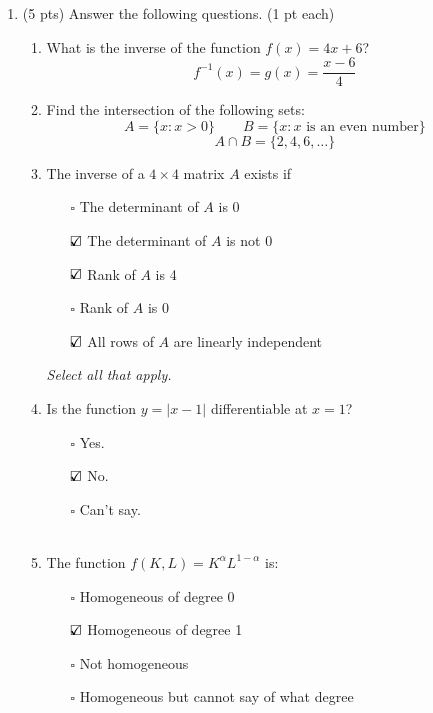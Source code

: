 \documentclass{./../../Latex/tests}
\begin{document}
\thispagestyle{plain}

\vspace{0.5em}

\begin{enumerate}
\item (5 pts) Answer the following questions. (1 pt each)
\begin{enumerate}
\item What is the inverse of the function $f(x)= 4x + 6$? \\
$$ f^{-1}(x) = g(x) = \frac{x-6}{4}  $$

\vspace{1em}
\item  Find the intersection of the following sets:
$$ A = \{x: x>0 \} \quad \quad B = \{x: x\text{ is an even number} \} $$ 
$$ A \cap B = \{2, 4, 6, \hdots \}  $$ 

\vspace{1em}
\item  The inverse of a $4\times 4$ matrix $A$ exists if
\begin{itemize}
	\item[$\square$] The determinant of $A$ is 0 
	\item[$\text{\rlap{$\checkmark$}}\square$] The determinant of $A$ is not 0 
	\item[$\text{\rlap{$\checkmark$}}\square$] Rank of $A$ is 4
	\item[$\square$] Rank of $A$ is 0
	\item[$\text{\rlap{$\checkmark$}}\square$] All rows of $A$ are linearly independent
\end{itemize}  
\textit{Select all that apply.}

\vspace{1em}
\item  Is the function $y=|x-1|$ differentiable at $x=1$? 
\begin{itemize}
	\item[$\square$] Yes. 
	\item[$\text{\rlap{$\checkmark$}}\square$] No.
	\item[$\square$] Can't say. \\~\\
\end{itemize}  
\item The function $f(K,L) = K^{\alpha} L^{1-\alpha}$ is:
\begin{itemize}
  \item[$\square$] Homogeneous of degree 0
  \item[$\text{\rlap{$\checkmark$}}\square$] Homogeneous of degree 1
  \item[$\square$] Not homogeneous 
  \item[$\square$] Homogeneous but cannot say of what degree \\~\\
\end{itemize}


\end{enumerate}
\end{enumerate}
\end{document}
